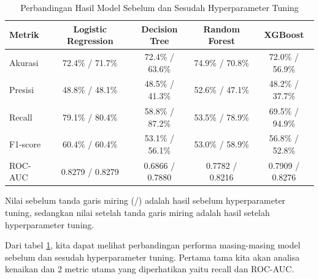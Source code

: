 \begin{table}[H]
    \centering
    \begin{threeparttable}
        \caption{Perbandingan Hasil Model Sebelum dan Sesudah Hyperparameter Tuning}
        \label{tab:comparison_all_models}
        \begin{tabular}{|l|c|c|c|c|}
            \hline
            \textbf{Metrik} & \textbf{Logistic Regression} & \textbf{Decision Tree} & \textbf{Random Forest} & \textbf{XGBoost} \\ \hline
            Akurasi & 72.4\% / 71.7\% & 72.4\% / 63.6\% & 74.9\% / 70.8\% & 72.0\% / 56.9\% \\ \hline
            Presisi & 48.8\% / 48.1\% & 48.5\% / 41.3\% & 52.6\% / 47.1\% & 48.2\% / 37.7\% \\ \hline
            Recall & 79.1\% / 80.4\% & 58.8\% / 87.2\% & 53.5\% / 78.9\% & 69.5\% / 94.9\% \\ \hline
            F1-score & 60.4\% / 60.4\% & 53.1\% / 56.1\% & 53.0\% / 58.9\% & 56.8\% / 52.8\% \\ \hline
            ROC-AUC & 0.8279 / 0.8279 & 0.6866 / 0.7880 & 0.7782 / 0.8216 & 0.7909 / 0.8276 \\ \hline
        \end{tabular}
        \begin{tablenotes}
            \item Nilai sebelum tanda garis miring (/) adalah hasil sebelum hyperparameter tuning, sedangkan nilai setelah tanda garis miring adalah hasil setelah hyperparameter tuning.
        \end{tablenotes}
    \end{threeparttable}
\end{table}

Dari tabel \ref{tab:comparison_all_models}, kita dapat melihat perbandingan performa masing-masing model sebelum dan sesudah hyperparameter tuning. Pertama tama kita akan analisa kenaikan dan 2 metric utama yang diperhatikan yaitu recall dan ROC-AUC.

